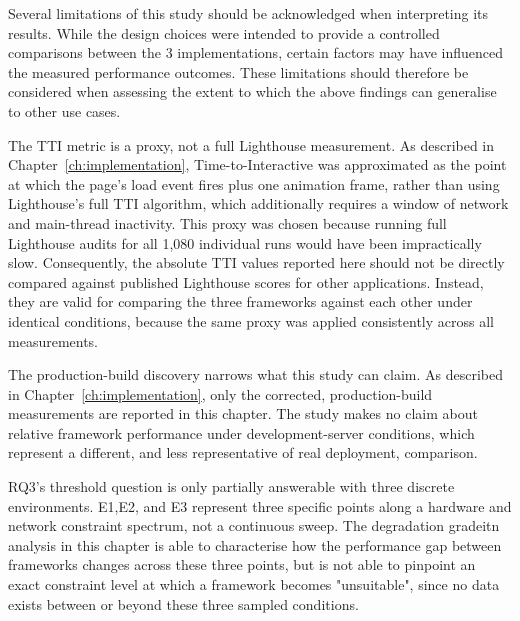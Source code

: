 \documentclass[11pt,a4paper]{report}
\begin{document}
Several limitations of this study should be acknowledged when interpreting its results. While the design choices were intended to provide a controlled comparisons between the 3 implementations, certain factors may have influenced the measured performance outcomes. These limitations should therefore be considered when assessing the extent to which the above findings can generalise to other use cases. 

\vspace{5mm}

The TTI metric is a proxy, not a full Lighthouse measurement. As described in Chapter~\ref{ch:implementation}, Time-to-Interactive was approximated as the point at which the page's load event fires plus one animation frame, rather than using Lighthouse's full TTI algorithm, which additionally requires a window of network and main-thread inactivity. This proxy was chosen because running full Lighthouse audits for all 1,080 individual runs would have been impractically slow. Consequently, the absolute TTI values reported here should not be directly compared against published Lighthouse scores for other applications. Instead, they are valid for comparing the three frameworks against each other under identical conditions, because the same proxy was applied consistently across all measurements. 

\vspace{5mm}

The production-build discovery narrows what this study can claim. As described in Chapter~\ref{ch:implementation}, only the corrected, production-build measurements are reported in this chapter. The study makes no claim about relative framework performance under development-server conditions, which represent a different, and less representative of real deployment, comparison. 

\vspace{5mm}

RQ3's threshold question is only partially answerable with three discrete environments. E1,E2, and E3 represent three specific points along a hardware and network constraint spectrum, not a continuous sweep. The degradation gradeitn analysis in this chapter is able to characterise how the performance gap between frameworks changes across these three points, but is not able to pinpoint an exact constraint level at which a framework becomes "unsuitable", since no data exists between or beyond these three sampled conditions. 

\vspace{5mm}
\end{document}
